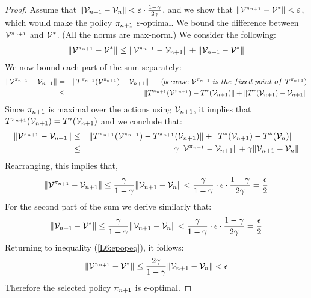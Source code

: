 \begin{proof}
Assume that $\|\mathcal{V}_{n+1}-\mathcal{V}_{n}\| < \varepsilon \cdot
\frac{1-\gamma}{2\gamma}$, and we show that
$\|\mathcal{V}^{\pi_{n+1}} - \mathcal{V}^{*}\| < \varepsilon$, which would
make the policy $\pi_{n+1}$ $\varepsilon$-optimal. We bound the
difference between $\mathcal{V}^{\pi_{n+1}}$ and $\mathcal{V}^*$. (All the
norms are max-norm.) We consider the following:
\begin{eqnarray}
\|\mathcal{V}^{\pi_{n+1}} - \mathcal{V}^{*}\| \leq
\|\mathcal{V}^{\pi_{n+1}} - \mathcal{V}_{n+1}\| + \|\mathcal{V}_{n+1} -
\mathcal{V}^{*}\| \label{L6:epopeq}
\end{eqnarray}
We now bound each part of the sum separately:
\begin{eqnarray*}
\|\mathcal{V}^{\pi_{n+1}} - \mathcal{V}_{n+1}\| & = &
\|T^{\pi_{n+1}}(\mathcal{V}^{\pi_{n+1}}) - \mathcal{V}_{n+1}\| \ \ \ \
\ (because\ \mathcal{V}^{\pi_{n+1}}\ is\ the\ fixed\ point\
of\ T^{\pi_{n+1}})\\
& \leq & \|T^{\pi_{n+1}}(\mathcal{V}^{\pi_{n+1}}) -
T^*(\mathcal{V}_{n+1})\| + \|T^*(\mathcal{V}_{n+1}) - \mathcal{V}_{n+1}\|
\end{eqnarray*}
Since $\pi_{n+1}$ is maximal over the actions using
$\mathcal{V}_{n+1}$, it implies that $T^{\pi_{n+1}}(\mathcal{V}_{n+1}) =
T^*(\mathcal{V}_{n+1})$ and we conclude that:
\begin{eqnarray*}
\|\mathcal{V}^{\pi_{n+1}} - \mathcal{V}_{n+1}\| & \leq &
\|T^{\pi_{n+1}}(\mathcal{V}^{\pi_{n+1}}) -
T^{\pi_{n+1}}(\mathcal{V}_{n+1})\| + \|T^*(\mathcal{V}_{n+1}) - T^*(\mathcal{V}_{n})\| \ \ \\
& \leq & \gamma\|\mathcal{V}^{\pi_{n+1}} - \mathcal{V}_{n+1}\| +
\gamma\|\mathcal{V}_{n+1} - \mathcal{V}_{n}\|
\end{eqnarray*}
Rearranging, this implies that,
\begin{eqnarray*} \|\mathcal{V}^{\pi_{n+1}} -
\mathcal{V}_{n+1}\| \leq \frac{\gamma}{1-\gamma}\|\mathcal{V}_{n+1} -
\mathcal{V}_{n}\|< \frac{\gamma}{1-\gamma} \cdot \epsilon \cdot
\frac{1-\gamma}{2\gamma} =\frac{\epsilon}{2}
\end{eqnarray*}
For the second part of the sum we derive similarly that:
\begin{eqnarray*}
\|\mathcal{V}_{n+1} - \mathcal{V}^{*}\| \leq
\frac{\gamma}{1-\gamma}\|\mathcal{V}_{n+1} - \mathcal{V}_{n}\|<
\frac{\gamma}{1-\gamma} \cdot \epsilon \cdot
\frac{1-\gamma}{2\gamma} =\frac{\epsilon}{2}
\end{eqnarray*}
Returning to inequality (\ref{L6:epopeq}), it follows:
\begin{eqnarray*}
\|\mathcal{V}^{\pi_{n+1}} - \mathcal{V}^{*}\| \leq
\frac{2\gamma}{1-\gamma}\|\mathcal{V}_{n+1} - \mathcal{V}_{n}\| <
\epsilon
\end{eqnarray*}
Therefore the selected policy $\pi_{n+1}$ is $\epsilon$-optimal.
\end{proof}


